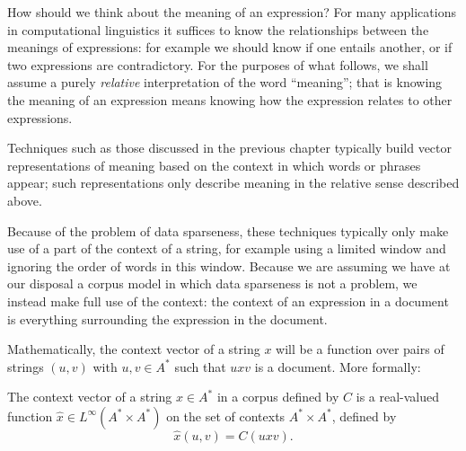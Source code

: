 \documentclass[11pt]{report}
\begin{document}
 How should we think about the meaning of an expression? For many applications in computational linguistics it suffices to know the relationships between the meanings of expressions: for example we should know if one entails another, or if two expressions are contradictory. For the purposes of what follows, we shall assume a purely \emph{relative} interpretation of the word ``meaning''; that is knowing the meaning of an expression means knowing how the expression relates to other expressions.

Techniques such as those discussed in the previous chapter typically build vector representations of meaning based on the context in which words or phrases appear; such representations only describe meaning in the relative sense described above.

Because of the problem of data sparseness, these techniques typically only make use of a part of the context of a string, for example using a limited window and ignoring the order of words in this window. Because we are assuming we have at our disposal a corpus model in which data sparseness is not a problem, we instead make full use of the context: the context of an expression in a document is  everything surrounding the expression in the document.




Mathematically, the context vector of a string $x$ will be a function over pairs of strings $(u,v)$ with $u,v \in A^*$ such that $uxv$ is a document. More formally:
\begin{defn}
The context vector of a string $x \in A^*$ in a corpus defined by $C$ is a real-valued function $\hat{x}\in L^\infty(A^*\times A^*)$  on the set of contexts $A^* \times A^*$, defined by
$$\hat{x}(u,v) = C(uxv).$$
\end{defn}
\end{document}
